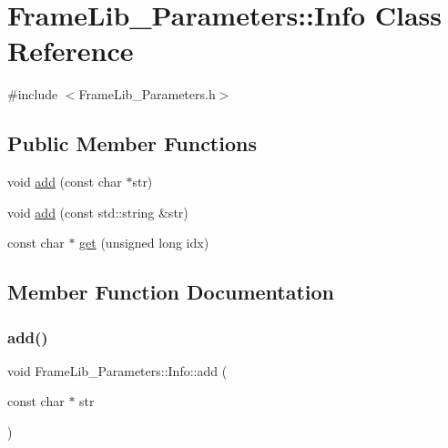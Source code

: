 \hypertarget{class_frame_lib___parameters_1_1_info}{}\section{Frame\+Lib\+\_\+\+Parameters\+:\+:Info Class Reference}
\label{class_frame_lib___parameters_1_1_info}


{\ttfamily \#include $<$Frame\+Lib\+\_\+\+Parameters.\+h$>$}

\subsection*{Public Member Functions}
\begin{DoxyCompactItemize}
\item 
void \hyperlink{class_frame_lib___parameters_1_1_info_a7d2360d181ac4e0d8e49af6b5777b38b}{add} (const char $\ast$str)
\item 
void \hyperlink{class_frame_lib___parameters_1_1_info_ae5b7b0ee9401ba93b5a15cc25f0f7863}{add} (const std\+::string \&str)
\item 
const char $\ast$ \hyperlink{class_frame_lib___parameters_1_1_info_a1f1518215e8de95d2e587de919ff47f0}{get} (unsigned long idx)
\end{DoxyCompactItemize}


\subsection{Member Function Documentation}
\mbox{\label{class_frame_lib___parameters_1_1_info_a7d2360d181ac4e0d8e49af6b5777b38b}} 
\subsubsection{\texorpdfstring{add()}{add()}\hspace{0.1cm}{\footnotesize\ttfamily [1/2]}}
{\footnotesize\ttfamily void Frame\+Lib\+\_\+\+Parameters\+::\+Info\+::add (\begin{DoxyParamCaption}\item[{const char $\ast$}]{str }\end{DoxyParamCaption})\hspace{0.3cm}{\ttfamily [inline]}}

